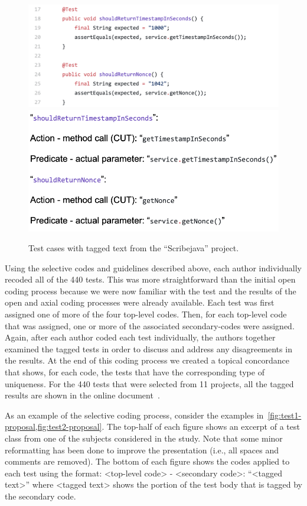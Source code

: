 \begin{figure}[t]
\centering
\includegraphics[scale=0.45]{figures/sp3-proposal.png}
\includegraphics[scale=0.45]{figures/sp1-proposal.png}
\caption{Test cases with tagged text from the \enquote{Scribejava} project.}
\label{fig:test1-proposal}
\end{figure}

Using the selective codes and guidelines described above, each author individually recoded all of the 440 tests.
%
This was more straightforward than the initial open coding process because we were now familiar with the test and the results of the open and axial coding processes were already available.
%
Each test was first assigned one of more of the four top-level codes.  Then, for each top-level code that was assigned, one or more of the associated secondary-codes were assigned.
%
Again, after each author coded each test individually, the authors together examined the tagged tests in order to discuss and address any disagreements in the results.
%
At the end of this coding process we created a topical concordance that shows, for each code, the tests that have the corresponding type of uniqueness.
%
For the 440 tests that were selected from 11 projects, all the tagged results are shown in the online document~\cite{emp-study}. 


As an example of the selective coding process, consider the examples in~\cref{fig:test1-proposal,fig:test2-proposal}.
%
The top-half of each figure shows an excerpt of a test class from one of the subjects considered in the study.
%
Note that some minor reformatting has been done to improve the presentation (i.e., all spaces and comments are removed).
%
The bottom of each figure shows the codes applied to each test using the format: <top-level code> - <secondary code>: \enquote{<tagged text>} where <tagged text> shows the portion of the test body that is tagged by the secondary code.

